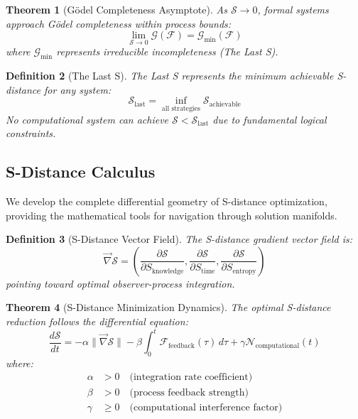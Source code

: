 \documentclass[12pt,a4paper]{article}
\newtheorem{theorem}{Theorem}[section]
\newtheorem{definition}[theorem]{Definition}
\begin{document}
\begin{theorem}[Gödel Completeness Asymptote]
As $\mathcal{S} \to 0$, formal systems approach Gödel completeness within process bounds:
\begin{equation}
\lim_{\mathcal{S} \to 0} \mathcal{G}(\mathcal{F}) = \mathcal{G}_{\text{min}}(\mathcal{F})
\end{equation}
where $\mathcal{G}_{\text{min}}$ represents irreducible incompleteness (The Last S).
\end{theorem}

\begin{definition}[The Last S]
The Last S represents the minimum achievable S-distance for any system:
\begin{equation}
\mathcal{S}_{\text{last}} = \inf_{\text{all strategies}} \mathcal{S}_{\text{achievable}}
\end{equation}
No computational system can achieve $\mathcal{S} < \mathcal{S}_{\text{last}}$ due to fundamental logical constraints.
\end{definition}

\subsection{S-Distance Calculus}

We develop the complete differential geometry of S-distance optimization, providing the mathematical tools for navigation through solution manifolds.

\begin{definition}[S-Distance Vector Field]
The S-distance gradient vector field is:
\begin{equation}
\vec{\nabla}\mathcal{S} = \left(\frac{\partial \mathcal{S}}{\partial S_{\text{knowledge}}}, \frac{\partial \mathcal{S}}{\partial S_{\text{time}}}, \frac{\partial \mathcal{S}}{\partial S_{\text{entropy}}}\right)
\end{equation}
pointing toward optimal observer-process integration.
\end{definition}

\begin{theorem}[S-Distance Minimization Dynamics]
The optimal S-distance reduction follows the differential equation:
\begin{equation}
\frac{d\mathcal{S}}{dt} = -\alpha \|\vec{\nabla}\mathcal{S}\| - \beta \int_0^t \mathcal{F}_{\text{feedback}}(\tau) \, d\tau + \gamma \mathcal{N}_{\text{computational}}(t)
\end{equation}
where:
\begin{align}
\alpha &> 0 \quad \text{(integration rate coefficient)} \\
\beta &> 0 \quad \text{(process feedback strength)} \\
\gamma &\geq 0 \quad \text{(computational interference factor)}
\end{align}
\end{theorem}
\end{document}
